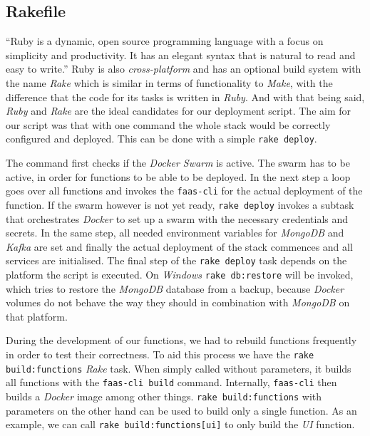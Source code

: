 \subsection{Rakefile}

“Ruby is a dynamic, open source programming language with a focus on simplicity and productivity. It
has an elegant syntax that is natural to read and easy to write.” \cite{ruby} Ruby is also
\textit{cross-platform} and has an optional build system with the name \textit{Rake} which is
similar in terms of functionality to \textit{Make}, with the difference that the code for its tasks
is written in \textit{Ruby}. And with that being said, \textit{Ruby} and \textit{Rake} are the ideal
candidates for our deployment script. The aim for our script was that with one command the whole
stack would be correctly configured and deployed. This can be done with a simple
\lstinline{rake deploy}.

The command first checks if the \textit{Docker Swarm} is active. The swarm has to be active, in
order for functions to be able to be deployed. In the next step a loop goes over all functions and
invokes the \texttt{faas-cli} for the actual deployment of the function. If the swarm however is not
yet ready, \lstinline{rake deploy} invokes a subtask that orchestrates \textit{Docker} to set up a
swarm with the necessary credentials and secrets. In the same step, all needed environment variables
for \textit{MongoDB} and \textit{Kafka} are set and finally the actual deployment of the stack
commences and all services are initialised. The final step of the \lstinline{rake deploy} task
depends on the platform the script is executed. On \textit{Windows} \lstinline{rake db:restore} will
be invoked, which tries to restore the \textit{MongoDB} database from a backup, because
\textit{Docker} volumes do not behave the way they should in combination with \textit{MongoDB} on
that platform.

During the development of our functions, we had to rebuild functions frequently in order to test
their correctness. To aid this process we have the \lstinline{rake build:functions} \textit{Rake}
task. When simply called without parameters, it builds all functions with the \texttt{faas-cli
build} command. Internally, \texttt{faas-cli} then builds a \textit{Docker} image among other
things. \lstinline{rake build:functions} with parameters on the other hand can be used to build only
a single function. As an example, we can call \lstinline{rake build:functions[ui]} to only build the
\textit{UI} function.


